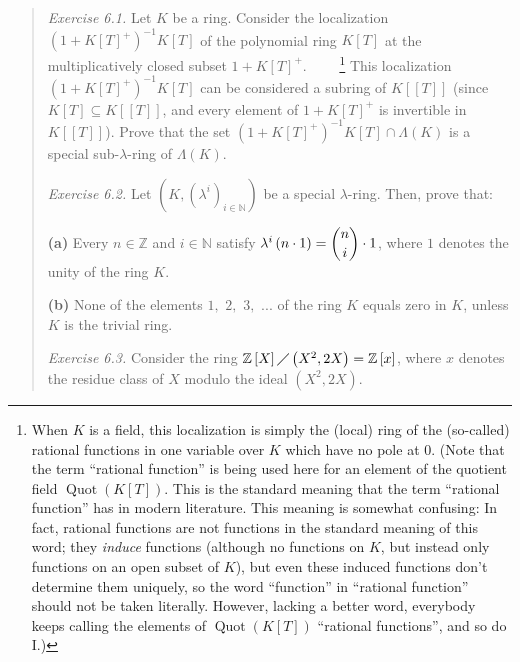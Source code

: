 \documentclass[numbers=enddot,12pt,final,onecolumn,notitlepage]{scrartcl}%
\begin{document}
\begin{quotation}
\textit{Exercise 6.1.} Let $K$ be a ring. Consider the localization $\left(
1+K\left[  T\right]  ^{+}\right)  ^{-1}K\left[  T\right]  $ of the polynomial
ring $K\left[  T\right]  $ at the multiplicatively closed subset $1+K\left[
T\right]  ^{+}$. \ \ \ \ \footnote{When $K$ is a field, this localization is
simply the (local) ring of the (so-called) rational functions in one variable
over $K$ which have no pole at $0$. (Note that the term ``rational function''
is being used here for an element of the quotient field $\operatorname*{Quot}%
\left(  K\left[  T\right]  \right)  $. This is the standard meaning that the
term ``rational function'' has in modern literature. This meaning is somewhat
confusing: In fact, rational functions are not functions in the standard
meaning of this word; they \textit{induce} functions (although no functions on
$K$, but instead only functions on an open subset of $K$), but even these
induced functions don't determine them uniquely, so the word ``function'' in
``rational function'' should not be taken literally. However, lacking a better
word, everybody keeps calling the elements of $\operatorname*{Quot}\left(
K\left[  T\right]  \right)  $ ``rational functions'', and so do I.)} This
localization $\left(  1+K\left[  T\right]  ^{+}\right)  ^{-1}K\left[
T\right]  $ can be considered a subring of $K\left[  \left[  T\right]
\right]  $ (since $K\left[  T\right]  \subseteq K\left[  \left[  T\right]
\right]  $, and every element of $1+K\left[  T\right]  ^{+}$ is invertible in
$K\left[  \left[  T\right]  \right]  $). Prove that the set $\left(
1+K\left[  T\right]  ^{+}\right)  ^{-1}K\left[  T\right]  \cap\Lambda\left(
K\right)  $ is a special sub-$\lambda$-ring of $\Lambda\left(  K\right)  $.

\textit{Exercise 6.2.} Let $\left(  K,\left(  \lambda^{i}\right)
_{i\in\mathbb{N}}\right)  $ be a special $\lambda$-ring. Then, prove that:

\textbf{(a)} Every $n\in\mathbb{Z}$ and $i\in\mathbb{N}$ satisfy $\lambda
^{i}\left(  n\cdot1\right)  =\dbinom{n}{i}\cdot1$, where $1$ denotes the unity
of the ring $K$.

\textbf{(b)} None of the elements $1,$ $2,$ $3,$ $...$ of the ring $K$ equals
zero in $K$, unless $K$ is the trivial ring.

\textit{Exercise 6.3.} Consider the ring $\mathbb{Z}\left[  X\right]
\diagup\left(  X^{2},2X\right)  =\mathbb{Z}\left[  x\right]  $, where $x$
denotes the residue class of $X$ modulo the ideal $\left(  X^{2},2X\right)  $.


\end{quotation}
\end{document}
